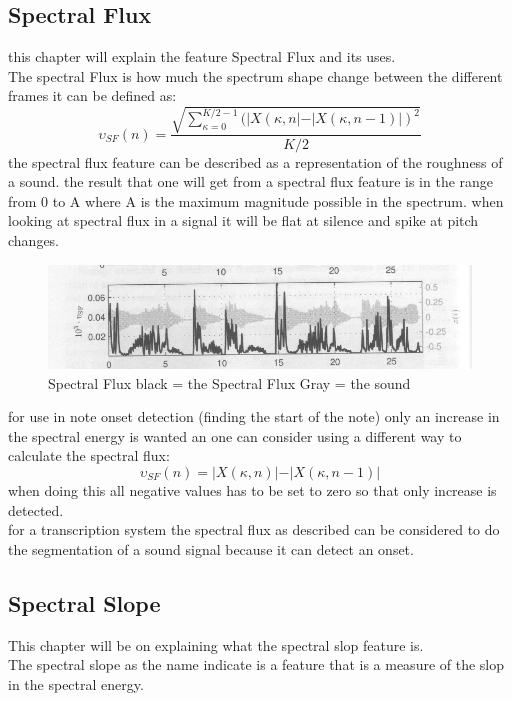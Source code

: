 \subsection{Spectral Flux}
this chapter will explain the feature Spectral Flux and its uses.\\
The spectral Flux is how much the spectrum shape change between the different frames it can be defined as:
\begin{equation}\label{Spectral Flux eq}
	\upsilon_{SF}(n) = \frac{\sqrt{\displaystyle\sum_{\kappa=0}^{K/2-1}(\vert X(\kappa,n\vert-\vert X(\kappa,n-1)\vert)^2}}{K/2}
\end{equation} 
the spectral flux feature can be described as a representation of the roughness of a sound. the result that one will get from a spectral flux feature is in the range from 0 to A where A is the maximum magnitude possible in the spectrum. when looking at spectral flux in a signal it will be flat at silence and spike at pitch changes.
\begin{figure}[h]
	\begin{center}
		\includegraphics[scale = 0.5]{fig/spectral_flux.jpg}
		\caption{Spectral Flux black = the Spectral Flux Gray = the sound}
		\label{Spectral flux pic}
	\end{center}
\end{figure}
for use in note onset detection (finding the start of the note) only an increase in the spectral energy is wanted an one can consider using a different way to calculate the spectral flux:
\begin{equation}
	\upsilon_{SF}(n) = \vert X(\kappa,n)\vert-\vert X(\kappa,n-1)\vert
\end{equation}
when doing this all negative values has to be set to zero so that only increase is detected.
\\
for a transcription system the spectral flux as described can be considered to do the segmentation of a sound signal because it can detect an onset. 
 
\subsection{Spectral Slope}
This chapter will be on explaining what the spectral slop feature is.\\
The spectral slope as the name indicate is a feature that is a measure of the slop in the spectral energy.
